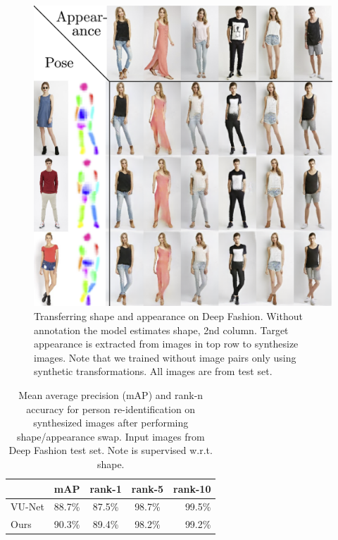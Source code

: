 	\begin{figure}[t]
		\centering
		\includegraphics[trim={0cm 0cm 0cm 0cm},clip, width=1.\linewidth]{fig/swappy}
		\caption{Transferring shape and appearance on Deep Fashion. Without annotation the model estimates shape, 2nd column. Target appearance is extracted from images in top row to synthesize images. Note that we trained without image pairs only using synthetic transformations.
		All images are from test set.}
		\label{fig:allswaps}
	\end{figure}
	\begin{table}
	\caption{Mean average precision (mAP) and rank-n accuracy for person re-identification on synthesized images after performing shape/appearance swap. Input images from Deep Fashion test set. Note \cite{esser18} is supervised w.r.t. shape.}
	\label{tab:reid}
	\begin{tabular}{l|cccr}
		\hline
		& mAP & rank-1 & rank-5 & rank-10 \\ \hline
		VU-Net \cite{esser18} & 88.7\% & 87.5\% & {98.7}\% & {99.5}\% \\
		Ours & {90.3}\% & {89.4}\% &{98.2}\% & {99.2}\% \\ \hline
	\end{tabular}
\end{table}
